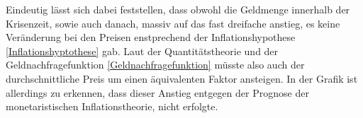 Eindeutig lässt sich dabei feststellen, dass obwohl die Geldmenge innerhalb der Krisenzeit, sowie auch danach, massiv auf das fast dreifache anstieg, es keine Veränderung bei den Preisen enstprechend der Inflationshypothese \vref{Inflationshyptothese} gab. Laut der Quantitätstheorie und der Geldnachfragefunktion \vref{Geldnachfragefunktion} müsste also auch der durchschnittliche Preis um einen äquivalenten Faktor ansteigen. In der Grafik ist allerdings zu erkennen, dass dieser Anstieg entgegen der Prognose der monetaristischen Inflationstheorie, nicht erfolgte.
